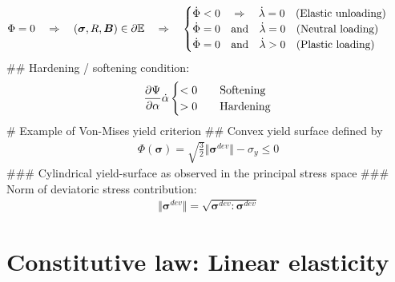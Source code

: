 \documentclass[]{scrartcl}
\begin{document}
\begin{easylist}[itemize]
\begin{align*}
\Phi = 0
  \quad &\Rightarrow \quad 
  \left( \boldsymbol{\sigma},R,\boldsymbol{B} \right) \in \partial\mathbb{E}
  \quad \Rightarrow \quad
  \begin{cases}
  \dot{\Phi} < 0 \quad \Rightarrow \quad \dot{\lambda} = 0 \quad  \textnormal{(Elastic unloading)} \\
  \dot{\Phi} = 0 \quad \textnormal{and} \quad \dot{\lambda} = 0 \quad  \textnormal{(Neutral loading)} \\
  \dot{\Phi} = 0 \quad \textnormal{and} \quad \dot{\lambda} > 0 \quad  \textnormal{(Plastic loading)}
  \end{cases}
\end{align*}
## Hardening / softening condition:
\begin{align*}
\frac{\partial \Psi}{\partial \alpha} \dot{\alpha}
\begin{cases}
< 0 \quad & \textnormal{Softening} \\
> 0 \quad & \textnormal{Hardening}
\end{cases}
\end{align*}
# Example of Von-Mises yield criterion
## Convex yield surface defined by
\begin{gather*}
\Phi \left( \boldsymbol{\sigma} \right)
 = \sqrt{\frac{3}{2}} \Vert \boldsymbol{\sigma}^{dev} \Vert - \sigma_{y} 
 \leq 0
\end{gather*}
### Cylindrical yield-surface as observed in the principal stress space
### Norm of deviatoric stress contribution:
\begin{gather*}
\Vert \boldsymbol{\sigma}^{dev} \Vert
  = \sqrt{\boldsymbol{\sigma}^{dev} : \boldsymbol{\sigma}^{dev}}
\end{gather*}
\end{easylist}

\clearpage
\section{Constitutive law: Linear elasticity}
\end{document}
